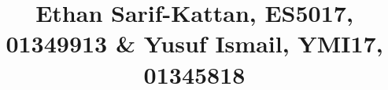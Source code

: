 \documentclass[10pt,twocolumn,letterpaper]{article}
\begin{document}
\title{
Ethan Sarif-Kattan, ES5017, 01349913 \&
Yusuf Ismail, YMI17, 01345818
}


\maketitle








\clearpage

{\small


}
\appendix

\end{document}
